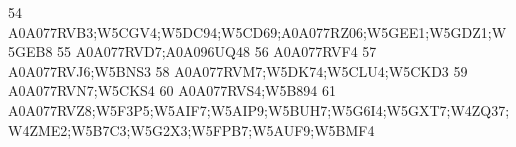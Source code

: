\documentclass{beamer}
\begin{document}
\begin{frame}[fragile]
\begin{itemize}
\begin{Schunk}
\begin{Soutput}
54                                                                                                                                                                                                                                                                                                                A0A077RVB3;W5CGV4;W5DC94;W5CD69;A0A077RZ06;W5GEE1;W5GDZ1;W5GEB8
55                                                                                                                                                                                                                                                                                                                                                          A0A077RVD7;A0A096UQ48
56                                                                                                                                                                                                                                                                                                                                                                     A0A077RVF4
57                                                                                                                                                                                                                                                                                                                                                              A0A077RVJ6;W5BNS3
58                                                                                                                                                                                                                                                                                                                                                A0A077RVM7;W5DK74;W5CLU4;W5CKD3
59                                                                                                                                                                                                                                                                                                                                                              A0A077RVN7;W5CKS4
60                                                                                                                                                                                                                                                                                                                                                              A0A077RVS4;W5B894
61                                                                                                                                                                                                                                                                          A0A077RVZ8;W5F3P5;W5AIF7;W5AIP9;W5BUH7;W5G6I4;W5GXT7;W4ZQ37;W4ZME2;W5B7C3;W5G2X3;W5FPB7;W5AUF9;W5BMF4

\end{Soutput}
\end{Schunk}
\end{itemize}
\end{frame}
\end{document}
